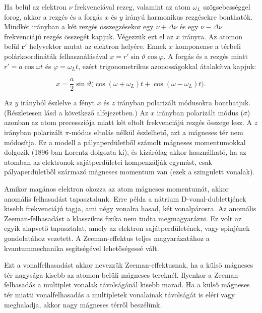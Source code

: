 \documentclass[../main.tex]{subfiles}
\begin{document}
Ha belül az elektron \(\nu\) frekvenciával rezeg, valamint az atom
\(\omega_L\) szögsebességgel forog, akkor a rezgés és a forgás
\(x\) és \(y\) irányú harmonikus rezgésekre bonthatók.
Mindkét irányban a két rezgés összegzésekor egy \(\nu+\Delta\nu\) és
egy \(\nu-\Delta\nu\) frekvenciájú rezgés összegét kapjuk.
Végezzük ezt el az \(x\) irányra.
Az atomon belül \(\mathbf{r}'\) helyvektor mutat az elektron helyére.
Ennek \(x\) komponense a térbeli polárkoordináták felhasználásával
\(x = r'\sin\vartheta\cos\varphi\).
A forgás és a rezgés miatt
\(r' = a\cos\omega t\) és \(\varphi=\omega_L t\), ezért trigonometrikus
azonosságokkal átalakítva kapjuk:

\begin{equation}
x = \frac{a}{2}\sin\vartheta\big(\cos(\omega+\omega_L)t + \cos(\omega-\omega_L)t\big).
\end{equation}

Az \(y\) irányból észlelve a fényt \(x\) és \(z\) irányban polarizált
módusokra bonthatjuk. (Részletesen lásd a következő alfejezetben.)
Az \(x\) irányban polarizált módus (\(\sigma\)) azonban az atom
precessziója miatt két eltolt frekvenciájú rezgés összege lesz.
A \(z\) irányban polarizált \(\pi\)-módus eltolás nélkül észlelhető,
azt a mágneses tér nem módosítja.
Ez a modell a pályaperdületből számolt mágneses momentumokkal dolgozik
(1896-ban Lorentz dolgozta ki), és kizárólag akkor használható, ha az
atomban az elektronok sajátperdületei kompenzálják egymást,
csak pályaperdületből származó mágneses momentum van
(ezek a szingulett vonalak).

Amikor magános elektron okozza az atom mágneses momentumát, akkor
anomális felhasadást tapasztalunk.
Erre példa a nátrium D-vonal-dublettjének kisebb frekvenciájú tagja,
ami négy vonalra hasad, két vonalpárosra.
Az anomális Zeeman-felhasadást a klasszikus fizika nem tudta megmagyarázni.
Ez volt az egyik alapvető tapasztalat, amely az elektron sajátperdületének,
vagy spinjének gondolatához vezetett.
A Zeeman-effektus teljes magyarázatához a kvantummechanika segítségével
lehetőségessé vált.

Ezt a vonalfelhasadást akkor nevezzük Zeeman-effektusnak, ha a külső
mágneses tér nagysága kisebb az atomon belüli mágneses tereknél.
Ilyenkor a Zeeman-felhasadás a multiplet vonalak távolságánál kisebb marad.
Ha a külső mágneses tér miatti vonalfelhasadás a multipletek vonalainak
távolságát is eléri vagy meghaladja, akkor nagy mágneses térről beszélünk.
\end{document}
